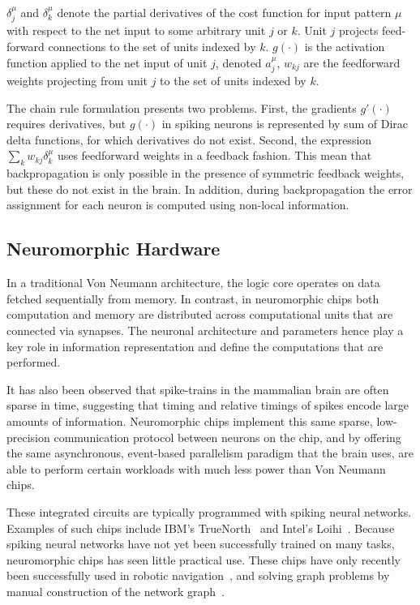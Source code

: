 \documentclass[fyp]{socreport}
\begin{document}
\(\delta_{j}^{\mu}\) and \(\delta_{k}^{\mu}\) denote the partial derivatives of
the cost function for input pattern \(\mu\) with respect to the net input to
some arbitrary unit \(j\) or \(k\). Unit \(j\) projects feed-forward connections
to the set of units indexed by \(k\).  \(g(\cdot)\) is the activation function
applied to the net input of unit \(j\), denoted \(a_j^{\mu}\), \(w_{kj}\) are
the feedforward weights projecting from unit \(j\) to the set of units indexed
by \(k\).

The chain rule formulation presents two problems. First, the gradients
\(g'(\cdot)\) requires derivatives, but \(g(\cdot)\) in spiking neurons is
represented by sum of Dirac delta functions, for which derivatives do not
exist. Second, the expression \(\sum_{k} w_{k j} \delta_{k}^{\mu}\) uses
feedforward weights in a feedback fashion. This mean that backpropagation is
only possible in the presence of symmetric feedback weights, but these do not
exist in the brain. In addition, during backpropagation the error assignment for
each neuron is computed using non-local information.

\subsection{Neuromorphic Hardware\label{neuromorphic}}

In a traditional Von Neumann architecture, the logic core operates on data
fetched sequentially from memory. In contrast, in neuromorphic chips both
computation and memory are distributed across computational units that are
connected via synapses. The neuronal architecture and parameters hence play a
key role in information representation and define the computations that are
performed.

It has also been observed that spike-trains in the mammalian brain are often
sparse in time, suggesting that timing and relative timings of spikes encode
large amounts of information. Neuromorphic chips implement this same sparse,
low-precision communication protocol between neurons on the chip, and by
offering the same asynchronous, event-based parallelism paradigm that the brain
uses, are able to perform certain workloads with much less power than Von
Neumann chips.

These integrated circuits are typically programmed with spiking neural
networks. Examples of such chips include IBM's TrueNorth~\cite{Merolla668} and
Intel's Loihi~\cite{davies2018loihi}. Because spiking neural networks have not
yet been successfully trained on many tasks, neuromorphic chips has seen little
practical use. These chips have only recently been successfully used in robotic
navigation~\cite{SnnSlam}, and solving graph problems by manual construction of
the network graph~\cite{Severa2016SpikingNA}.
\end{document}
